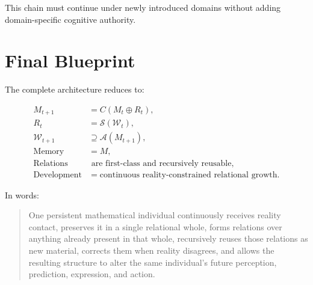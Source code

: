 \documentclass[11pt]{article}
\newcommand{\W}{\mathcal{W}}
\newcommand{\Sx}{\mathcal{S}}
\newcommand{\Ax}{\mathcal{A}}
\begin{document}
This chain must continue under newly introduced domains without adding domain-specific cognitive authority.

\section{Final Blueprint}

The complete architecture reduces to:

\[
\boxed{
\begin{aligned}
M_{t+1} &= C(M_t\oplus R_t),\\[4pt]
R_t &= \Sx(\W_t),\\[4pt]
\W_{t+1} &\supseteq \Ax(M_{t+1}),\\[4pt]
\text{Memory} &= M,\\[4pt]
\text{Relations} &\text{ are first-class and recursively reusable},\\[4pt]
\text{Development} &=
\text{continuous reality-constrained relational growth}.
\end{aligned}
}
\]

In words:

\begin{quote}
One persistent mathematical individual continuously receives reality contact, preserves it in a single relational whole, forms relations over anything already present in that whole, recursively reuses those relations as new material, corrects them when reality disagrees, and allows the resulting structure to alter the same individual's future perception, prediction, expression, and action.
\end{quote}
\end{document}
